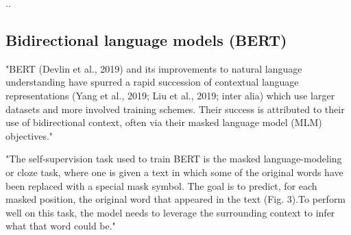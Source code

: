 

%	
%		
%

%

..

\subsection{Bidirectional language models (BERT)}


"BERT (Devlin et al., 2019) and its improvements to natural language understanding have spurred a rapid succession of contextual language representations (Yang et al., 2019; Liu et al., 2019; inter alia) which use larger datasets and more involved training schemes. Their success is attributed to their use of bidirectional context, often via their masked language model (MLM) objectives." \citet{salazar2020masked}

"The self-supervision task used to train BERT is the masked language-modeling  or  cloze  task,  where  one  is  given  a  text  in which  some  of  the  original  words  have  been  replaced  with  a special  mask  symbol.  The  goal  is  to  predict,  for  each  masked position,  the  original  word  that  appeared  in  the  text  (Fig.  3).To perform well on this task, the model needs to leverage the surrounding context to infer what that word could be." \citep{manning2020emergent}



